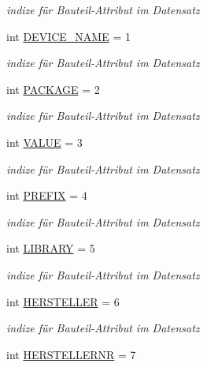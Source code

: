 \begin{DoxyCompactItemize}
\begin{DoxyCompactList}\small\item\em indize für Bauteil-\/\+Attribut im Datensatz \end{DoxyCompactList}\item 
int \hyperlink{_platzhalter_ersetzen_8ulp_a6fe0f5b0418b2132d12ac49aa4081291}{D\+E\+V\+I\+C\+E\+\_\+\+N\+A\+M\+E} = 1
\begin{DoxyCompactList}\small\item\em indize für Bauteil-\/\+Attribut im Datensatz \end{DoxyCompactList}\item 
int \hyperlink{_platzhalter_ersetzen_8ulp_a2d0a92f7c80ad7c1fae87f79bbaa300f}{P\+A\+C\+K\+A\+G\+E} = 2
\begin{DoxyCompactList}\small\item\em indize für Bauteil-\/\+Attribut im Datensatz \end{DoxyCompactList}\item 
int \hyperlink{_platzhalter_ersetzen_8ulp_ad822e380cd5270d0a2aa33a677dde305}{V\+A\+L\+U\+E} = 3
\begin{DoxyCompactList}\small\item\em indize für Bauteil-\/\+Attribut im Datensatz \end{DoxyCompactList}\item 
int \hyperlink{_platzhalter_ersetzen_8ulp_a12efc69ea4176b0f4db6e857cb7f0756}{P\+R\+E\+F\+I\+X} = 4
\begin{DoxyCompactList}\small\item\em indize für Bauteil-\/\+Attribut im Datensatz \end{DoxyCompactList}\item 
int \hyperlink{_platzhalter_ersetzen_8ulp_a24327f241c43e49fd9913294c6d7ddb3}{L\+I\+B\+R\+A\+R\+Y} = 5
\begin{DoxyCompactList}\small\item\em indize für Bauteil-\/\+Attribut im Datensatz \end{DoxyCompactList}\item 
int \hyperlink{_platzhalter_ersetzen_8ulp_af1d4fe1dc2c108fc8a59c5b3b90252a3}{H\+E\+R\+S\+T\+E\+L\+L\+E\+R} = 6
\begin{DoxyCompactList}\small\item\em indize für Bauteil-\/\+Attribut im Datensatz \end{DoxyCompactList}\item 
int \hyperlink{_platzhalter_ersetzen_8ulp_ab14fde5d8767bd16f5b91ed81d0d462d}{H\+E\+R\+S\+T\+E\+L\+L\+E\+R\+N\+R} = 7

\end{DoxyCompactItemize}
